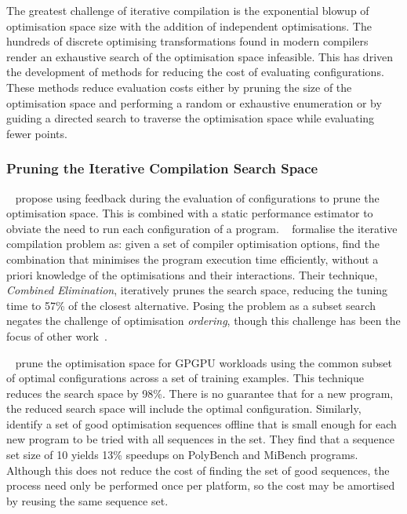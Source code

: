 The greatest challenge of iterative compilation is the exponential blowup of optimisation space size with the addition of independent optimisations. The hundreds of discrete optimising transformations found in modern compilers render an exhaustive search of the optimisation space infeasible. This has driven the development of methods for reducing the cost of evaluating configurations. These methods reduce evaluation costs either by pruning the size of the optimisation space and performing a random or exhaustive enumeration or by guiding a directed search to traverse the optimisation space while evaluating fewer points.


\subsubsection{Pruning the Iterative Compilation Search Space}

\citeauthor{Triantafyllis2003}~\cite{Triantafyllis2003} propose using feedback during the evaluation of configurations to prune the optimisation space. This is combined with a static performance estimator to obviate the need to run each configuration of a program. \citeauthor{Pan2006}~\cite{Pan2006} formalise the iterative compilation problem as: given a set of compiler optimisation options, find the combination that minimises the program execution time efficiently, without a priori knowledge of the optimisations and their interactions. Their technique, \emph{Combined Elimination}, iteratively prunes the search space, reducing the tuning time to 57\% of the closest alternative. Posing the problem as a subset search negates the challenge of optimisation \emph{ordering}, though this challenge has been the focus of other work~\cite{Kulkarni2012,Purini2013}.

\citeauthor{Ryoo2008}~\cite{Ryoo2008} prune the optimisation space for GPGPU workloads using the common subset of optimal configurations across a set of training examples. This technique reduces the search space by 98\%. There is no guarantee that for a new program, the reduced search space will include the optimal configuration.
Similarly, \citeauthor{Purini2013}~\cite{Purini2013} identify a set of good optimisation sequences offline that is small enough for each new program to be tried with all sequences in the set. They find that a sequence set size of 10 yields 13\% speedups on PolyBench and MiBench programs. Although this does not reduce the cost of finding the set of good sequences, the process need only be performed once per platform, so the cost may be amortised by reusing the same sequence set.

